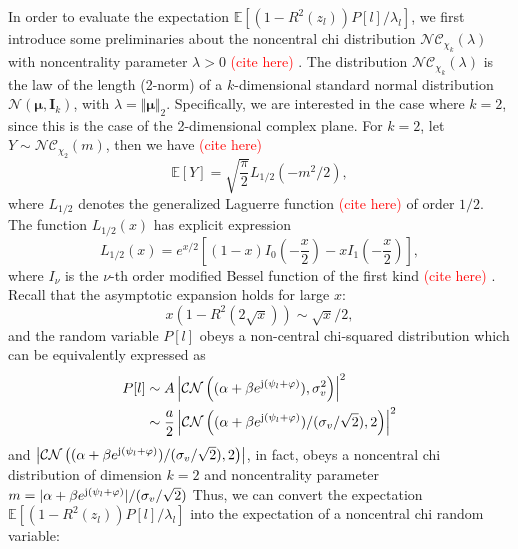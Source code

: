 \documentclass[12pt,draftclsnofoot,journal,onecolumn]{IEEEtran}
\theoremstyle{nonumberplain}
\def \CN {\mathcal{CN}}
\def \nc {\mathcal{NC}}
\def \ch {\textcolor{red}{(cite here) }}
\begin{document}
    In order to evaluate the expectation $\mathbb{E}[(1-R^2(z_l))P[l]/\lambda_l]$, we first introduce some preliminaries about the noncentral chi distribution $\nc_{\chi_k}(\lambda)$ with noncentrality parameter $\lambda>0$ \ch. The distribution $\nc_{\chi_k}(\lambda)$ is the law of the length (2-norm) of a $k$-dimensional standard normal distribution $\mathcal{N}({\bm \mu}, {\bm I}_k)$, with $\lambda = \Vert {\bm \mu} \Vert_2$. Specifically, we are interested in the case where $k=2$, since this is the case of the 2-dimensional complex plane. For  $k=2$, let $Y \sim \nc_{\chi_2}(m)$, then we have \ch
    \begin{equation}
        \mathbb{E}\left[Y\right] = \sqrt{\frac{\pi}{2}}L_{1/2}(-m^2/2),
        \label{eqn:noncentral chi mean}
    \end{equation}
    where $L_{1/2}$ denotes the generalized Laguerre function \ch of order $1/2$. The function $L_{1/2}(x)$ has explicit expression 
    \begin{equation}
        L_{1/2}(x) = e^{x/2}\left[(1-x)I_0\left(-\frac{x}{2}\right)-xI_1\left(-\frac{x}{2}\right) \right],
        \label{eqn:Laguerre half order}
    \end{equation}
    where $I_\nu$ is the $\nu$-th order  modified Bessel function of the first kind \ch. Recall that the asymptotic expansion holds for large $x$:
    \begin{equation}
        x(1-R^2(2\sqrt{x})) \sim \sqrt{x}/2,
        \label{eqn:asym_expansion}
    \end{equation}
    and the random variable $P[l]$ obeys a non-central chi-squared distribution which can be equivalently expressed as 
    \begin{equation}
        \begin{aligned}
        P[l] &\sim A\left| \CN\left( (\alpha + \beta e^{{\rm j} (\psi_l + \varphi)}), \sigma_v^2 \right)\right|^2 \\
        &\sim \frac{a}{2} \left| \CN\left((\alpha + \beta e^{{\rm j} (\psi_l + \varphi)})/(\sigma_v / \sqrt{2}), 2\right)\right|^2\\
        \end{aligned}
    \end{equation}
    and $\left| \CN\left((\alpha + \beta e^{{\rm j} (\psi_l + \varphi)})/(\sigma_v / \sqrt{2}), 2\right)\right|$, in fact, obeys a noncentral chi distribution of dimension $k=2$ and noncentrality parameter $m=\lvert\alpha + \beta e^{{\rm j} (\psi_l + \varphi)}\rvert/(\sigma_v / \sqrt{2})$ Thus, we can convert the expectation  $\mathbb{E}[(1-R^2(z_l))P[l]/\lambda_l]$ into the expectation of a noncentral chi random variable:
\end{document}
